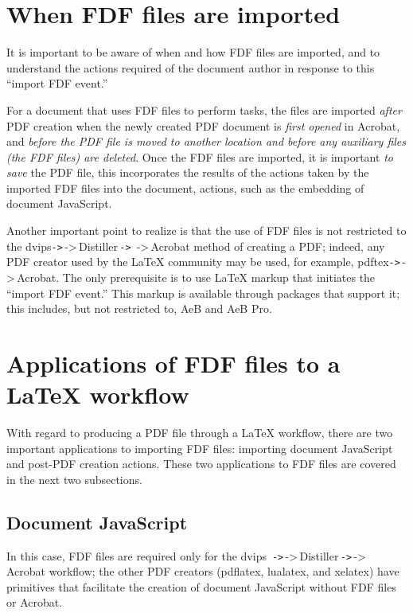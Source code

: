 \documentclass{article}
\let\tops\texorpdfstring
\def\parboxValign{t}
\newcommand{\FmtMP}[2][0pt]{\mbox{}\marginpar{%
    \raisebox{.5\baselineskip+#1}{%
    \expandafter\parbox\expandafter[\parboxValign]%
        {\marginparwidth}{\aebbkFmtMp#2}}}}
\def\aebbkFmtMp{\kern0pt\itshape\small
    \ifusebw\color{gray}\else\color{blue}\fi
    \raggedleft\hspace{0pt}}
\def\AEBP{\app{AeB Pro}}
\def\AEB{\app{AeB}}
\let\app\textsf
\begin{document}
\section{When FDF files are imported}

It is important to be aware of when and how FDF files are imported, and to
understand the actions required of the document author in response to this
``import FDF event.''

For a document that uses FDF files to perform tasks, the files are imported
\emph{after} PDF creation when the newly created PDF document is \emph{first
opened} in \app{Acrobat}, and \emph{before the PDF file is moved to another
location and before any auxiliary files (the FDF files) are deleted}. Once
the FDF files are imported, it is important \emph{to save}\FmtMP{Save the
PDF} the PDF file, this incorporates the results of the actions taken by the
imported FDF files into the document, actions, such as the embedding of
document JavaScript.

Another important point to realize is that the use of FDF files is not
restricted to the
\app{dvips\ifpdf\texttt{->}\,\else->\,\fi\app{Distiller}\,\ifpdf\texttt{->}\,\ignorespaces
\else->\,\fi\app{Acrobat}} method of creating a PDF; indeed, any PDF creator
used by the {\LaTeX} community may be used, for example,
\app{pdftex\ifpdf\texttt{->}\allowbreak\,\else->\,\fi\app{Acrobat}}.  The
only prerequisite is to use {\LaTeX} markup that initiates the ``import FDF
event.'' This markup is available through packages that support it; this
includes, but not restricted to, {\AEB} and {\AEBP}.

\section{Applications of FDF files to a \tops{\LaTeX}{LaTeX} workflow}

With regard to producing a PDF file through a {\LaTeX} workflow, there are
two important applications to importing FDF files: importing document
JavaScript and post-PDF creation actions. These two applications to FDF files
are covered in the next two subsections.

\subsection{Document JavaScript}

In this case, FDF files are required only for the \app{dvips\,\ignorespaces
\ifpdf\texttt{->}\,\else->\,\fi\app{Distiller}\,\ifpdf\texttt{->}\,\else->\,\ignorespaces
\fi\app{Acrobat}} workflow; the other PDF creators (\app{pdflatex},
\app{lualatex}, and \app{xelatex}) have primitives that facilitate the
creation of document JavaScript without FDF files or \app{Acrobat}.
\end{document}
